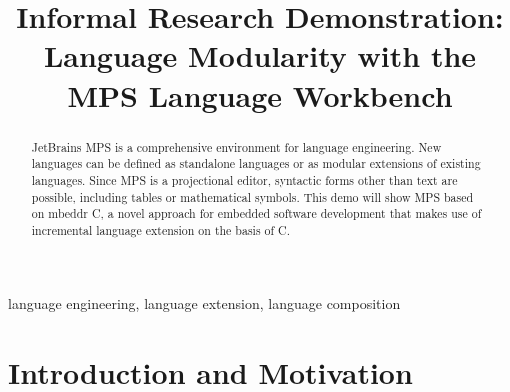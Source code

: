 \documentclass[10pt, conference, compsocconf]{IEEEtran}
\begin{document}
%
\title{Informal Research Demonstration: \\ Language Modularity with the MPS
Language Workbench}

 

\author{
\and
{}
}

\newcommand{\changefont}[3]{\fontfamily{#1}\fontseries{#2}\fontshape{#3}\selectfont}

\newcommand\todo[1]{\mynote{TODO}{#1}} 
\newcommand{\fig}[1]{Fig.~\ref{#1}}
\newcommand{\sect}[1]{Section~\ref{#1}}
\newcommand{\ic}[1]{\changefont{cmtt}{m}{n}{#1}\normalfont}  %
\newcommand{\lcr}[1]{\changefont{cmtt}{m}{n}{#1}\normalfont} %

\newcommand{\pp}[1]{ \vspace{2mm}\noindent\textbf{{#1}} }


\maketitle


\begin{abstract}
JetBrains MPS is a comprehensive environment for language engineering.
New languages can be defined as standalone languages or as modular extensions of
existing languages. Since MPS is a projectional editor, syntactic forms other
than text are possible, including tables or mathematical symbols. This
demo will show MPS based on mbeddr C, a novel approach for embedded software
development that makes use of incremental language extension on the basis of C.
\end{abstract}

\begin{IEEEkeywords}
language engineering, language extension, language composition
\end{IEEEkeywords}

\section{Introduction and Motivation}
\end{document}
